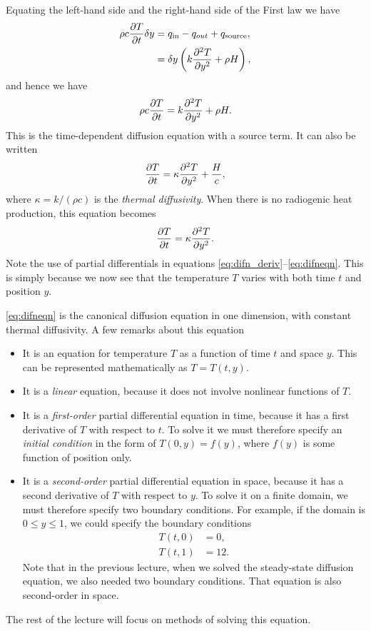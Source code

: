 \documentclass[11pt,twoside,a4paper]{article}
\begin{document}
Equating the left-hand side and the right-hand side of the First law
we have
\begin{align}
  \label{eq:difn_deriv}
  \rho c \frac{\partial T}{\partial t}\delta y &= q_\text{in} - q_{out} + q_\text{source},\nonumber\\
                              &= \delta y \left(k\frac{\partial^2 {T}}{\partial {y}^2} + \rho H\right),
\end{align}
and hence we have
\begin{displaymath}
  \rho c \frac{\partial T}{\partial t} = k\frac{\partial^2 {T}}{\partial {y}^2} + \rho H.
\end{displaymath}
This is the time-dependent diffusion equation with a source term.  It
can also be written
\begin{equation}
  \label{eq:difneqn_source}
  \frac{\partial T}{\partial t} = \kappa\frac{\partial^2 {T}}{\partial {y}^2} + \frac{H}{c},
\end{equation}
where $\kappa = k/(\rho c)$ is the \textit{thermal diffusivity}.  When
there is no radiogenic heat production, this equation becomes
\begin{equation}
  \label{eq:difneqn}
  \frac{\partial T}{\partial t} = \kappa\frac{\partial^2 {T}}{\partial {y}^2}.
\end{equation}
Note the use of partial differentials in equations
\eqref{eq:difn_deriv}--\eqref{eq:difneqn}.  This is simply because we
now see that the temperature $T$ varies with both time $t$ and
position $y$.

\autoref{eq:difneqn} is the canonical diffusion equation in one
dimension, with constant thermal diffusivity. A few remarks about this
equation
\begin{itemize}
\item It is an equation for temperature $T$ as a function of time $t$
  and space $y$.  This can be represented mathematically as
  $T=T(t,y)$.
\item It is a \textit{linear} equation, because it does not involve
  nonlinear functions of $T$.
\item It is a \textit{first-order} partial differential equation in
  time, because it has a first derivative of $T$ with respect to
  $t$. To solve it we must therefore specify an \textit{initial
    condition} in the form of $T(0,y) = f(y)$, where $f(y)$ is some
  function of position only.
\item It is a \textit{second-order} partial differential equation in
  space, because it has a second derivative of $T$ with respect to
  $y$.  To solve it on a finite domain, we must therefore specify two
  boundary conditions.  For example, if the domain is $0\le y \le 1$,
  we could specify the boundary conditions
  \begin{subequations}
    \begin{align}
      T(t,0) &= 0,\\
      T(t,1) &= 12.
    \end{align}
  \end{subequations}
  Note that in the previous lecture, when we solved the steady-state
  diffusion equation, we also needed two boundary conditions.  That
  equation is also second-order in space.
\end{itemize}
The rest of the lecture will focus on methods of solving this
equation.
\end{document}
